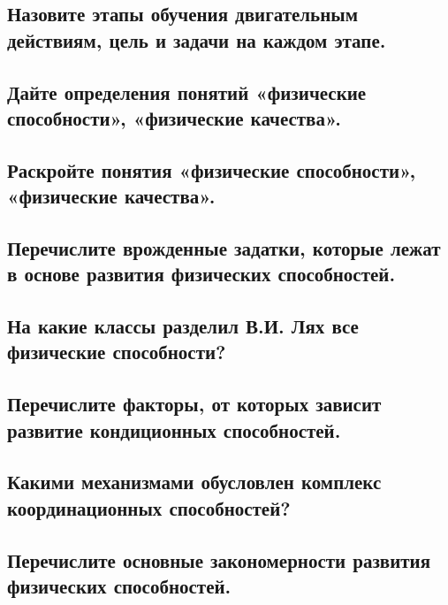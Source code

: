 \subsection{Назовите этапы обучения двигательным действиям, цель и задачи на каждом этапе.}



\subsection{Дайте определения понятий «физические способности», «физические качества».}



\subsection{Раскройте понятия «физические способности», «физические качества».}



\subsection{Перечислите врожденные задатки, которые лежат в основе развития физических способностей.}



\subsection{На какие классы разделил В.И. Лях все физические способности?}



\subsection{Перечислите факторы, от которых зависит развитие кондиционных способностей.}



\subsection{Какими механизмами обусловлен комплекс координационных способностей?}



\subsection{Перечислите основные закономерности развития физических способностей.}



